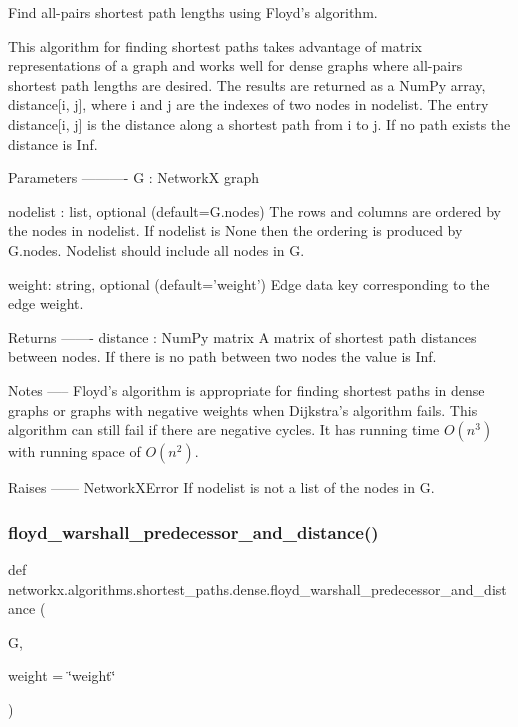 \begin{DoxyVerb}Find all-pairs shortest path lengths using Floyd's algorithm.

This algorithm for finding shortest paths takes advantage of
matrix representations of a graph and works well for dense
graphs where all-pairs shortest path lengths are desired.
The results are returned as a NumPy array, distance[i, j],
where i and j are the indexes of two nodes in nodelist.
The entry distance[i, j] is the distance along a shortest
path from i to j. If no path exists the distance is Inf.

Parameters
----------
G : NetworkX graph

nodelist : list, optional (default=G.nodes)
   The rows and columns are ordered by the nodes in nodelist.
   If nodelist is None then the ordering is produced by G.nodes.
   Nodelist should include all nodes in G.

weight: string, optional (default='weight')
   Edge data key corresponding to the edge weight.

Returns
-------
distance : NumPy matrix
    A matrix of shortest path distances between nodes.
    If there is no path between two nodes the value is Inf.

Notes
-----
Floyd's algorithm is appropriate for finding shortest paths in
dense graphs or graphs with negative weights when Dijkstra's
algorithm fails. This algorithm can still fail if there are negative
cycles. It has running time $O(n^3)$ with running space of $O(n^2)$.

Raises
------
NetworkXError
    If nodelist is not a list of the nodes in G.
\end{DoxyVerb}
 \mbox{\label{namespacenetworkx_1_1algorithms_1_1shortest__paths_1_1dense_a720bd1dfc4a1a191a840459462076a09}} 
\subsubsection{\texorpdfstring{floyd\+\_\+warshall\+\_\+predecessor\+\_\+and\+\_\+distance()}{floyd\_warshall\_predecessor\_and\_distance()}}
{\footnotesize\ttfamily def networkx.\+algorithms.\+shortest\+\_\+paths.\+dense.\+floyd\+\_\+warshall\+\_\+predecessor\+\_\+and\+\_\+distance (\begin{DoxyParamCaption}\item[{}]{G,  }\item[{}]{weight = {\ttfamily \char`\"{}weight\char`\"{}} }\end{DoxyParamCaption})}

